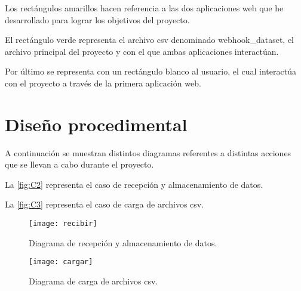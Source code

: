 Los rectángulos amarillos hacen referencia a las dos aplicaciones web que he desarrollado para lograr los objetivos del proyecto.

El rectángulo verde representa el archivo csv denominado webhook\_dataset, el archivo principal del proyecto y con el que ambas aplicaciones interactúan.

Por último se representa con un rectángulo blanco al usuario, el cual interactúa con el proyecto a través de la primera aplicación web.

\section{Diseño procedimental}
A continuación se muestran distintos diagramas referentes a distintas acciones que se llevan a cabo durante el proyecto.

La \autoref{fig:C2} representa el caso de recepción y almacenamiento de datos.

La \autoref{fig:C3} representa el caso de carga de archivos csv.

\begin{figure}
    \centering
    \texttt{[image: recibir]} 
    \caption{Diagrama de recepción y almacenamiento de datos.}
    \label{fig:C2}
\end{figure}


\begin{figure}
    \centering
    \texttt{[image: cargar]} 
    \caption{Diagrama de carga de archivos csv.}
    \label{fig:C3}
\end{figure}